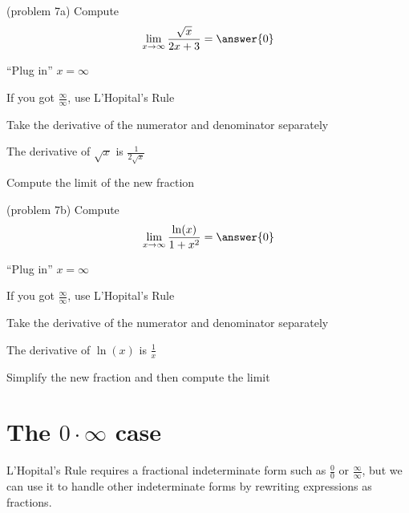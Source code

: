\documentclass[handout]{ximera}
\begin{document}
\begin{problem}(problem 7a)
  Compute
  \[
  \lim_{x \to \infty} \frac{\sqrt x}{2x + 3} = \answer{0}
  \]
  
    \begin{hint}
      ``Plug in'' $x=\infty$
    \end{hint}
    \begin{hint}
      If you got $\frac{\infty}{\infty}$, use L'Hopital's Rule
    \end{hint}
    \begin{hint}
      Take the derivative of the numerator and denominator separately
    \end{hint}
		\begin{hint}
		  The derivative of $\sqrt x$ is $\frac{1}{2\sqrt x}$
	  \end{hint}
		\begin{hint}
      Compute the limit of the new fraction
    \end{hint}
	
\end{problem}

\begin{problem}(problem 7b)
  Compute
  \[
  \lim_{x \to \infty} \frac{\ln(x)}{1 + x^2} = \answer{0}
  \]
  
    \begin{hint}
      ``Plug in'' $x=\infty$
    \end{hint}
    \begin{hint}
      If you got $\frac{\infty}{\infty}$, use L'Hopital's Rule
    \end{hint}
    \begin{hint}
      Take the derivative of the numerator and denominator separately
    \end{hint}
		\begin{hint}
		  The derivative of $\ln(x)$ is $\frac{1}{x}$
	  \end{hint}
		\begin{hint}
      Simplify the new fraction and then compute the limit
    \end{hint}
	
\end{problem}


\section{The $0 \cdot \infty$ case}

L'Hopital's Rule requires a fractional indeterminate form such as $\frac00$ or $\frac{\infty}{\infty}$, 
but we can use it to handle other indeterminate forms by rewriting expressions as fractions.
\end{document}
